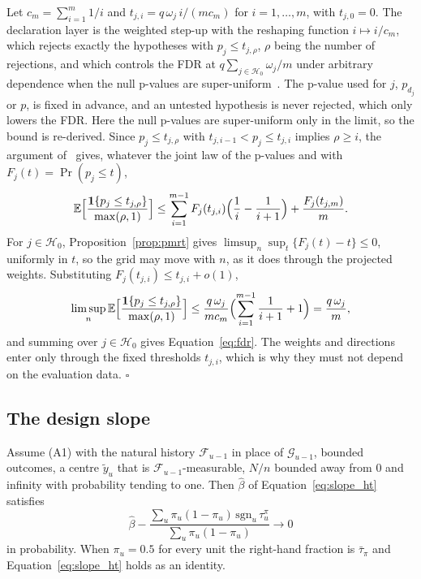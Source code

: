 Let $c_m = \sum_{i=1}^m 1/i$ and $t_{j,i} = q\, \omega_j\, i / (m c_m)$ for $i = 1, \dots, m$, with $t_{j,0} = 0$. The
declaration layer is the weighted step-up with the reshaping function $i \mapsto i / c_m$, which rejects exactly the hypotheses
with $p_j \le t_{j,\rho}$, $\rho$ being the number of rejections, and which controls the FDR at
$q \sum_{j \in \mathcal{H}_0} \omega_j / m$ under arbitrary dependence when the null p-values are
super-uniform~\cite[Thm.~4.2]{blanchard2008fdr}. The p-value used for $j$, $p_{d_j}$ or $p$, is fixed in advance, and
an untested hypothesis is never rejected, which only lowers the FDR. Here the null p-values are super-uniform only in
the limit, so the bound is re-derived. Since $p_j \le t_{j,\rho}$ with $t_{j,i-1} < p_j \le t_{j,i}$ implies
$\rho \ge i$, the argument of~\cite{benjamini2001dependency} gives, whatever the joint law of the p-values and with
$F_j(t) = \Pr(p_j \le t)$,
\begin{equation*}
\mathbb{E}\Bigl[\frac{\mathbf{1}\{p_j \le t_{j,\rho}\}}{\max(\rho, 1)}\Bigr]
\le \sum_{i=1}^{m-1} F_j(t_{j,i}) \Bigl(\frac{1}{i} - \frac{1}{i+1}\Bigr) + \frac{F_j(t_{j,m})}{m}.
\end{equation*}
For $j \in \mathcal{H}_0$, Proposition~\ref{prop:pmrt} gives
$\limsup_n \sup_t \{F_j(t) - t\} \le 0$, uniformly in $t$, so the grid may move with $n$, as it does
through the projected weights. Substituting $F_j(t_{j,i}) \le t_{j,i} + o(1)$,
\begin{equation*}
\limsup_{n} \mathbb{E}\Bigl[\frac{\mathbf{1}\{p_j \le t_{j,\rho}\}}{\max(\rho, 1)}\Bigr]
\le \frac{q\, \omega_j}{m c_m} \Bigl( \sum_{i=1}^{m-1} \frac{1}{i+1} + 1 \Bigr) = \frac{q\, \omega_j}{m},
\end{equation*}
and summing over $j \in \mathcal{H}_0$ gives Equation~\eqref{eq:fdr}. The weights and directions
enter only through the fixed thresholds $t_{j,i}$, which is why they must not depend on the
evaluation data. \hfill$\square$

\subsection{The design slope}
\label{app:proof_slope}

\begin{lemma}
\label{lem:slope}
Assume (A1) with the natural history $\mathcal{F}_{u-1}$ in place of $\mathcal{G}_{u-1}$, bounded
outcomes, a centre $\tilde y_u$ that is $\mathcal{F}_{u-1}$-measurable, $N / n$ bounded away from 0 and
infinity with probability tending to one. Then
$\hat\beta$ of Equation~\eqref{eq:slope_ht} satisfies
\begin{equation*}
\hat\beta - \frac{\sum_u \pi_u (1 - \pi_u)\, \mathrm{sgn}_u\, \tau_u^{\pi}}{\sum_u \pi_u (1 - \pi_u)} \to 0
\end{equation*}
in probability. When $\pi_u = 0.5$ for every unit the right-hand fraction is $\bar\tau_{\pi}$
and Equation~\eqref{eq:slope_ht} holds as an identity.
\end{lemma}

